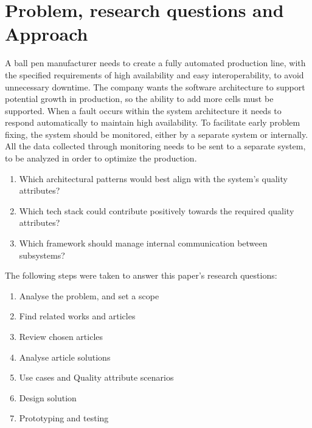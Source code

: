 \section{Problem, research questions and Approach}

\label{sec:problem}
A ball pen manufacturer needs to create a fully automated production line, with the specified requirements of high availability and easy interoperability, to avoid unnecessary downtime. 
The company wants the software architecture to support potential growth in production, so the ability to add more cells must be supported. 
When a fault occurs within the system architecture it needs to respond automatically to maintain high availability. To facilitate early problem fixing, the system should be monitored, either by a separate system or internally. All the data collected through monitoring needs to be sent to a separate system, to be analyzed in order to optimize the production.  \\ 

\begin{enumerate}
    \item Which architectural patterns would best align with the system's quality attributes?
    \item Which tech stack could contribute positively towards the required quality attributes?
    \item Which framework should manage internal communication between subsystems?\\
\end{enumerate}

The following steps were taken to answer this paper's research questions: 
\\
\begin{enumerate}
    \item Analyse the problem, and set a scope
    \item Find related works and articles
    \item Review chosen articles
    \item Analyse article solutions
    \item Use cases and Quality attribute scenarios
    \item Design solution
    \item Prototyping and testing
\end{enumerate}
